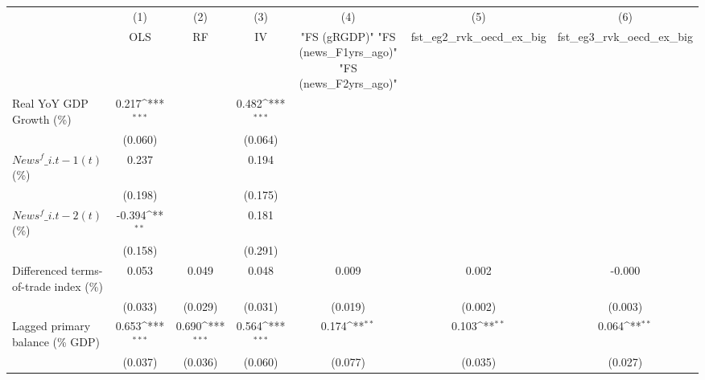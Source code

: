 {
\def\sym#1{\ifmmode^{#1}\else\(^{#1}\)\fi}
\begin{tabular}{l*{6}{c}}
\toprule
                    &\multicolumn{1}{c}{(1)}&\multicolumn{1}{c}{(2)}&\multicolumn{1}{c}{(3)}&\multicolumn{1}{c}{(4)}&\multicolumn{1}{c}{(5)}&\multicolumn{1}{c}{(6)}\\
                    &\multicolumn{1}{c}{OLS}&\multicolumn{1}{c}{RF}&\multicolumn{1}{c}{IV}&\multicolumn{1}{c}{ "FS (gRGDP)"  "FS (news\_F1yrs\_ago)"  "FS (news\_F2yrs\_ago)" }&\multicolumn{1}{c}{fst\_eg2\_rvk\_oecd\_ex\_big}&\multicolumn{1}{c}{fst\_eg3\_rvk\_oecd\_ex\_big}\\
\midrule
Real YoY GDP Growth (\%)&       0.217\sym{***}&                     &       0.482\sym{***}&                     &                     &                     \\
                    &     (0.060)         &                     &     (0.064)         &                     &                     &                     \\
\addlinespace
$ News^f\_{i.t-1}(t)$ (\%)&       0.237         &                     &       0.194         &                     &                     &                     \\
                    &     (0.198)         &                     &     (0.175)         &                     &                     &                     \\
\addlinespace
$ News^f\_{i.t-2}(t)$ (\%)&      -0.394\sym{**} &                     &       0.181         &                     &                     &                     \\
                    &     (0.158)         &                     &     (0.291)         &                     &                     &                     \\
\addlinespace
Differenced terms-of-trade index (\%)&       0.053         &       0.049         &       0.048         &       0.009         &       0.002         &      -0.000         \\
                    &     (0.033)         &     (0.029)         &     (0.031)         &     (0.019)         &     (0.002)         &     (0.003)         \\
\addlinespace
Lagged primary balance (\% GDP)&       0.653\sym{***}&       0.690\sym{***}&       0.564\sym{***}&       0.174\sym{**} &       0.103\sym{**} &       0.064\sym{**} \\
                    &     (0.037)         &     (0.036)         &     (0.060)         &     (0.077)         &     (0.035)         &     (0.027)         \\

\end{tabular}}
